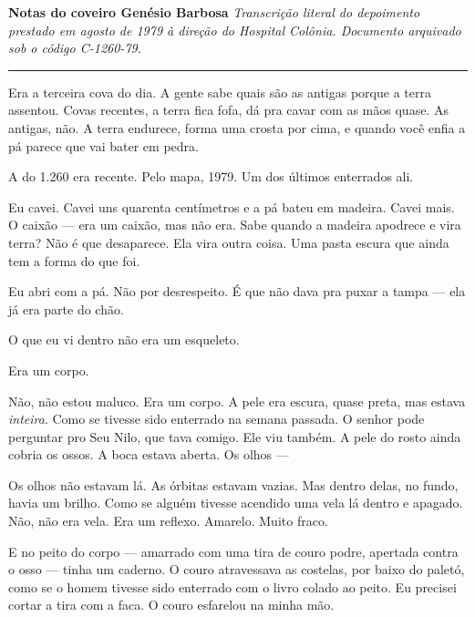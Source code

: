 
\noindent \textbf{Notas do coveiro Genésio Barbosa}
\textit{Transcrição literal do depoimento prestado em agosto de 1979 à direção do Hospital Colônia. Documento arquivado sob o código C-1260-79.}

\vspace{0.5em}\noindent\rule{\textwidth}{0.5pt}\vspace{0.5em}

\noindent Era a terceira cova do dia. A gente sabe quais são as antigas porque a terra assentou. Covas recentes, a terra fica fofa, dá pra cavar com as mãos quase. As antigas, não. A terra endurece, forma uma crosta por cima, e quando você enfia a pá parece que vai bater em pedra.

\noindent A do 1.260 era recente. Pelo mapa, 1979. Um dos últimos enterrados ali.

\noindent Eu cavei. Cavei uns quarenta centímetros e a pá bateu em madeira. Cavei mais. O caixão --- era um caixão, mas não era. Sabe quando a madeira apodrece e vira terra? Não é que desaparece. Ela vira outra coisa. Uma pasta escura que ainda tem a forma do que foi.

\noindent Eu abri com a pá. Não por desrespeito. É que não dava pra puxar a tampa --- ela já era parte do chão.

\noindent O que eu vi dentro não era um esqueleto.

\noindent Era um corpo.

\noindent Não, não estou maluco. Era um corpo. A pele era escura, quase preta, mas estava \textit{inteira}. Como se tivesse sido enterrado na semana passada. O senhor pode perguntar pro Seu Nilo, que tava comigo. Ele viu também. A pele do rosto ainda cobria os ossos. A boca estava aberta. Os olhos ---

\noindent Os olhos não estavam lá. As órbitas estavam vazias. Mas dentro delas, no fundo, havia um brilho. Como se alguém tivesse acendido uma vela lá dentro e apagado. Não, não era vela. Era um reflexo. Amarelo. Muito fraco.

\noindent E no peito do corpo --- amarrado com uma tira de couro podre, apertada contra o osso --- tinha um caderno. O couro atravessava as costelas, por baixo do paletó, como se o homem tivesse sido enterrado com o livro colado ao peito. Eu precisei cortar a tira com a faca. O couro esfarelou na minha mão.

